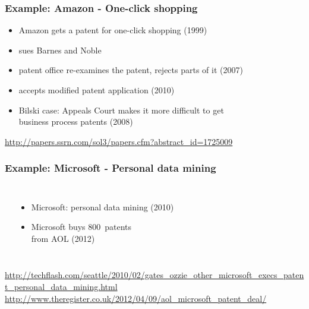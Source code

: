 \documentclass[dvipsnames]{beamer}
\theoremstyle{plain}
\begin{document}
\begin{frame}
  \frametitle{Example: Amazon - One-click shopping}

  \begin{itemize}
    \item Amazon gets a patent for one-click shopping (1999)
    \item sues Barnes and Noble
    \item patent office re-examines the patent, rejects parts of it (2007)
    \item accepts modified patent application (2010)

    \pause
    \medskip
    \item Bilski case: Appeals Court makes it more difficult to get\\
      business process patents (2008)
  \end{itemize}

  \medskip
  \tiny{\url{http://papers.ssrn.com/sol3/papers.cfm?abstract_id=1725009}}\\
\end{frame}

\begin{frame}
  \frametitle{Example: Microsoft - Personal data mining}

  \begin{columns}
    \begin{center}
    \end{center}

    \begin{itemize}
      \item Microsoft: personal data mining (2010)
      \item Microsoft buys 800~patents\\
        from AOL (2012)
    \end{itemize}
  \end{columns}

  \medskip
  \tiny{\url{http://techflash.com/seattle/2010/02/gates_ozzie_other_microsoft_execs_patent_personal_data_mining.html}}\\
  \tiny{\url{http://www.theregister.co.uk/2012/04/09/aol_microsoft_patent_deal/}}\\
\end{frame}
\end{document}

